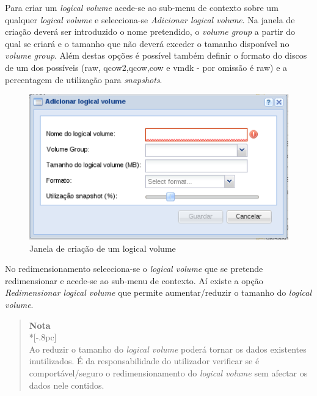 Para criar um \emph{logical volume} acede-se ao sub-menu de contexto sobre um qualquer \emph{logical volume} e selecciona-se \emph{Adicionar logical volume}.
Na janela de criação deverá ser introduzido o nome pretendido, o \emph{volume group} a partir do qual se criará e o tamanho que não deverá exceder o tamanho disponível no \emph{volume group}.
Além destas opções é possível também definir o formato do discos de um dos possíveis (raw, qcow2,qcow,cow e vmdk - por omissão é raw) e a percentagem de utilização para \emph{snapshots}.

\begin{figure}[H]
        \begin{center}
        \includegraphics[scale=0.5]{screenshots/storage_lv_create.png}
        \caption{Janela de criação de um logical volume}
        \label{fig:storage_lv_create}
        \end{center}
\end{figure}

No redimensionamento selecciona-se o \emph{logical volume} que se pretende redimensionar e acede-se ao sub-menu de contexto. Aí existe a opção \emph{Redimensionar logical volume} que permite aumentar/reduzir o tamanho do \emph{logical volume}.


\begin{quote}
	{\large \bf Nota} \\*[-.8pc]
	\underline{\hspace{6in}} \\
	Ao reduzir o tamanho do \emph{logical volume} poderá tornar os dados existentes inutilizados. É da responsabilidade do utilizador verificar se é comportável/seguro o redimensionamento do \emph{logical volume} sem afectar os dados nele contidos.
\end{quote}


